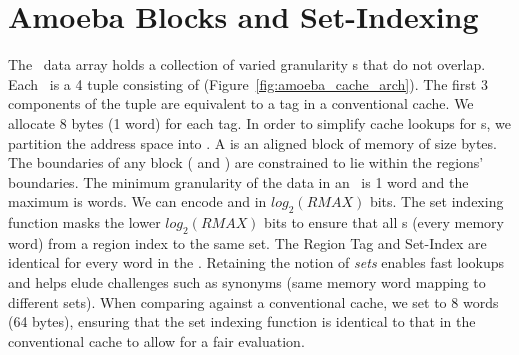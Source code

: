\section{Amoeba Blocks and Set-Indexing}

The \AC\ data array holds a collection of varied granularity \AB{}s that do not overlap. Each \AB\ is a 4 tuple consisting of  (Figure~\ref{fig:amoeba_cache_arch}). The first 3 components of the tuple are equivalent to a tag in a conventional cache. We allocate 8 bytes (1 word) for each tag. In order to simplify cache lookups for \AB{}s, we partition the address space into . A  is an aligned block of memory of size  bytes. The boundaries of any \AB{} block ( and ) are constrained to lie within the regions' boundaries. The minimum granularity of the data in an \AB\ is 1 word and the maximum is  words. We can encode  and  in $log_2(RMAX)$ bits. The set indexing function  masks the lower $log_2(RMAX)$ bits to ensure that all \AB{}s (every memory word) from a region index to the same set.  The Region Tag and Set-Index are identical for every word in the \AB{}. Retaining the notion of \textit{sets} enables fast lookups and helps elude challenges such as synonyms (same memory word mapping to different sets). When comparing against a conventional cache, we set  to 8 words (64 bytes), ensuring that the set indexing function is identical to that in the conventional cache to allow for a fair evaluation.





